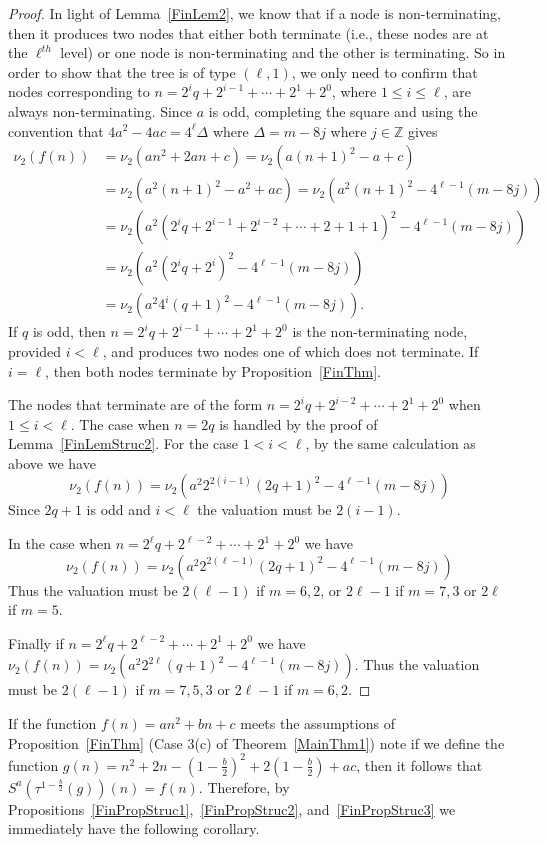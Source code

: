 \documentclass[12pt]{article}
\begin{document}
\begin{proof}
In light of Lemma~\ref{FinLem2}, we know that if a node is non-terminating, then it produces two nodes that either both terminate (i.e., these nodes are at the $\ell^{th}$ level) or one node is non-terminating and the other is terminating. So in order to show that the tree is of type $(\ell,1)$, we only need to confirm that nodes corresponding to $n=2^{i}q+2^{i-1}+\cdots+2^{1}+2^{0}$, where $1\leq i\leq\ell$, are always non-terminating. Since $a$ is odd, completing the square and using the convention that $4a^{2}-4ac=4^{\ell}\Delta$ where $\Delta=m-8j$ where $j\in\mathbb{Z}$ gives
\begin{align*}
\nu_{2}(f(n))&=\nu_{2}(an^{2}+2an+c)=\nu_{2}(a(n+1)^{2}-a+c)\\
&=\nu_{2}(a^{2}(n+1)^{2}-a^{2}+ac)=\nu_{2}(a^{2}(n+1)^{2}-4^{\ell-1}(m-8j))\\
&=\nu_{2}(a^{2}(2^{i}q+2^{i-1}+2^{i-2}+\cdots+2+1+1)^{2}-4^{\ell-1}(m-8j))\\
&=\nu_{2}(a^{2}(2^{i}q+2^{i})^{2}-4^{\ell-1}(m-8j))\\
&=\nu_{2}(a^{2}4^{i}(q+1)^{2}-4^{\ell-1}(m-8j)).
\end{align*}
If $q$ is odd, then $n=2^{i}q+2^{i-1}+\cdots+2^{1}+2^{0}$ is the non-terminating node, provided $i<\ell$, and produces two nodes one of which does not terminate. If $i=\ell$, then both nodes terminate by Proposition~\ref{FinThm}.

The nodes that terminate are of the form $n=2^{i}q+2^{i-2}+\cdots+2^{1}+2^{0}$ when $1\leq i<\ell$. The case when $n=2q$ is handled by the proof of Lemma~\ref{FinLemStruc2}. For the case $1<i<\ell$, by the same calculation as above we have $$\nu_{2}(f(n))=\nu_{2}(a^{2}2^{2(i-1)}(2q+1)^{2}-4^{\ell-1}(m-8j))$$ Since $2q+1$ is odd and $i<\ell$ the valuation must be $2(i-1)$.

In the case when $n=2^{\ell}q+2^{\ell-2}+\cdots+2^{1}+2^{0}$ we have $$\nu_{2}(f(n))=\nu_{2}(a^{2}2^{2(\ell-1)}(2q+1)^{2}-4^{\ell-1}(m-8j))$$ Thus the valuation must be $2(\ell-1)$ if $m=6,2$, or $2\ell-1$ if $m=7,3$ or $2\ell$ if $m=5$.

Finally if $n=2^{\ell}q+2^{\ell-2}+\cdots+2^{1}+2^{0}$ we have $\nu_{2}(f(n))=\nu_{2}(a^{2}2^{2\ell}(q+1)^{2}-4^{\ell-1}(m-8j))$. Thus the valuation must be $2(\ell-1)$ if $m=7,5,3$ or $2\ell-1$ if $m=6,2$.
\end{proof}

If the function $f(n)=an^{2}+bn+c$ meets the assumptions of Proposition~\ref{FinThm} (Case 3(c) of Theorem~\ref{MainThm1}) note if we define the function $g(n)=n^{2}+2n-\left(1-\frac{b}{2}\right)^{2}+2\left(1-\frac{b}{2}\right)+ac$, then 
it follows that $S^{a}(\tau^{1-\frac{b}{2}}(g))(n)=f(n)$. Therefore, by Propositions~\ref{FinPropStruc1},~\ref{FinPropStruc2}, and~\ref{FinPropStruc3} we immediately have the following corollary.
\end{document}
